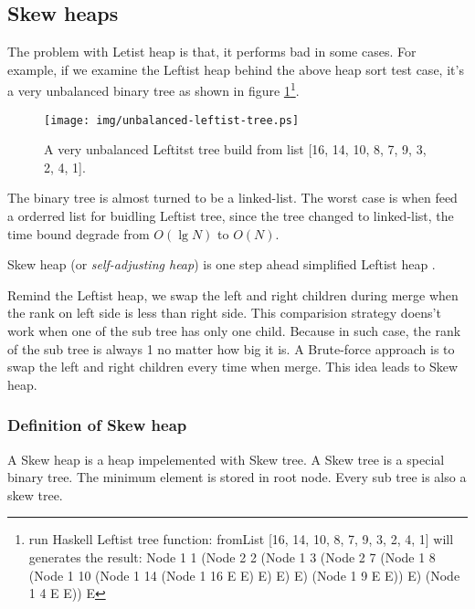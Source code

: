 \documentclass{article}
\begin{document}


\subsection{Skew heaps}
\label{skew-heap}

The problem with Letist heap is that, it performs bad in some cases.
For example, if we examine the Leftist heap behind the above heap
sort test case, it's a very unbalanced binary tree as shown in figure
\ref{fig:unbalanced-leftist-tree}\footnote{run Haskell Leftist tree
function: fromList [16, 14, 10, 8, 7, 9, 3, 2, 4, 1] will generates
the result: Node 1 1 (Node 2 2 (Node 1 3 (Node 2 7 (Node 1 8 (Node 1 10 (Node 1 14 (Node 1 16 E E) E) E) E) (Node 1 9 E E)) E) (Node 1 4 E E)) E}.

\begin{figure}[htbp]
   \begin{center}
   	  \texttt{[image: img/unbalanced-leftist-tree.ps]}
    \caption{A very unbalanced Leftitst tree build from list [16, 14, 10, 8, 7, 9, 3, 2, 4, 1].} \label{fig:unbalanced-leftist-tree}
   \end{center}
\end{figure}

The binary tree is almost turned to be a linked-list. The worst case
is when feed a orderred list for buidling Leftist tree, since the 
tree changed to linked-list, the time bound degrade from $O(\lg N)$
to $O(N)$.

Skew heap (or {\em self-adjusting heap}) is one step ahead simplified Leftist heap \cite{wiki-skew-heap} \cite{self-adjusting-heaps}.

Remind the Leftist heap, we swap the left and right children during merge
when the rank on left side is less than right side. This comparision strategy 
doens't work when one of the sub tree has only one child. Because
in such case, the rank of the sub tree is always 1 no matter how
big it is. A Brute-force approach is to swap the left and right children
every time when merge. This idea leads to Skew heap.

\subsubsection{Definition of Skew heap}

A Skew heap is a heap impelemented with Skew tree. A Skew tree is a special 
binary tree. The minimum element is stored in root node. Every sub tree is 
also a skew tree.
\end{document}
